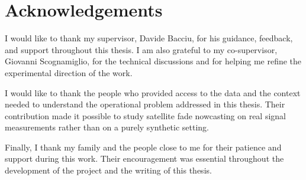 \chapter*{Acknowledgements}

I would like to thank my supervisor, Davide Bacciu, for his guidance,
feedback, and support throughout this thesis. I am also grateful to my
co-supervisor, Giovanni Scognamiglio, for the technical discussions and for
helping me refine the experimental direction of the work.

I would like to thank the people who provided access to the data and the
context needed to understand the operational problem addressed in this thesis.
Their contribution made it possible to study satellite fade nowcasting on real
signal measurements rather than on a purely synthetic setting.

Finally, I thank my family and the people close to me for their patience and
support during this work. Their encouragement was essential throughout the
development of the project and the writing of this thesis.
